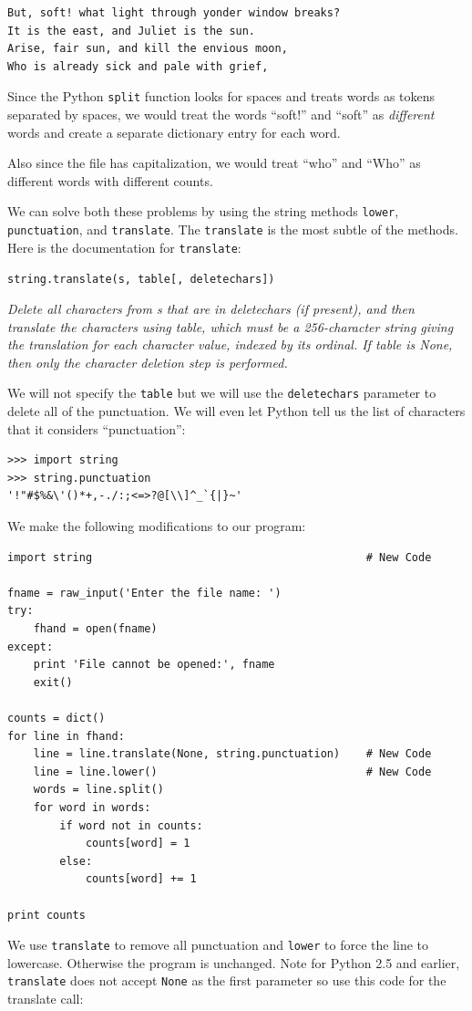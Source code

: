 \documentclass[10pt]{book}
\begin{document}
\beforeverb
\begin{verbatim}
But, soft! what light through yonder window breaks?
It is the east, and Juliet is the sun.
Arise, fair sun, and kill the envious moon,
Who is already sick and pale with grief,
\end{verbatim}
\afterverb
%
Since the Python {\tt split} function looks for spaces and
treats words as tokens separated by spaces, we would treat the
words ``soft!'' and ``soft'' as \emph{different} words and create
a separate dictionary entry for each word.

Also since the file has capitalization, we would treat
``who'' and ``Who'' as different words with different 
counts.

We can solve both these problems by using the string
methods {\tt lower}, {\tt punctuation}, and {\tt translate}.  The 
{\tt translate} is the most subtle of the methods.  
Here is the documentation for {\tt translate}:

\verb"string.translate(s, table[, deletechars])"

\emph{Delete all characters from s that are in deletechars (if present), 
and then translate the characters using table, which must 
be a 256-character string giving the translation for each 
character value, indexed by its ordinal. If table is None, 
then only the character deletion step is performed.}

We will not specify the {\tt table} but we will use 
the {\tt deletechars} parameter to delete all of the punctuation.
We will even let Python tell us the list of characters
that it considers ``punctuation'':

\beforeverb
\begin{verbatim}
>>> import string
>>> string.punctuation
'!"#$%&\'()*+,-./:;<=>?@[\\]^_`{|}~'
\end{verbatim}
\afterverb
%
We make the following modifications to our program:

\beforeverb
\begin{verbatim}
import string                                          # New Code

fname = raw_input('Enter the file name: ')
try:
    fhand = open(fname)
except:
    print 'File cannot be opened:', fname
    exit()

counts = dict()
for line in fhand:
    line = line.translate(None, string.punctuation)    # New Code
    line = line.lower()                                # New Code
    words = line.split()
    for word in words:
        if word not in counts:
            counts[word] = 1
        else:
            counts[word] += 1

print counts
\end{verbatim}
\afterverb
%
We use {\tt translate} to remove all punctuation and {\tt lower} to 
force the line to lowercase.  Otherwise the program is unchanged.
Note for Python 2.5 and earlier, {\tt translate} does not 
accept {\tt None} as the first parameter so use this code for the translate 
call:
\end{document}

